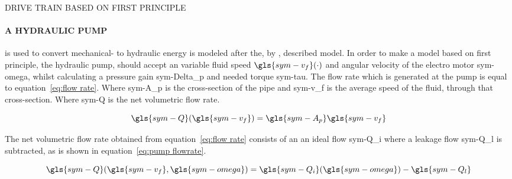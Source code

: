 \begin{RoyalFigure}[!htb, label=fig:propulsionsystemmodel]{DRIVE TRAIN BASED ON FIRST PRINCIPLE}
\end{RoyalFigure}
\newpage

\paragraph{A HYDRAULIC PUMP} is used to convert mechanical- to hydraulic energy is modeled after the, by
\citet{mathworks_mechanical_hydraulic_2016}, described model. In order to make a model based on first principle, the
hydraulic pump, should accept an variable fluid speed \( \gls{sym-v_f}(\cdot) \) and angular velocity of the electro
motor \gls{sym-omega}, whilst calculating a pressure gain \gls{sym-Delta_p} and needed torque \gls{sym-tau}. The flow
rate which is generated at the pump is equal to equation~\ref{eq:flow rate}. Where \gls{sym-A_p} is the cross-section of
the pipe and \gls{sym-v_f} is the average speed of the fluid, through that cross-section. Where \gls{sym-Q} is the net
volumetric flow rate.

\begin{equation}
    \label{eq:flow rate}
    \gls{sym-Q}(\gls{sym-v_f}) = \gls{sym-A_p} \gls{sym-v_f}
\end{equation}

\noindent The net volumetric flow rate obtained from equation~\ref{eq:flow rate} consists of an an ideal flow
\gls{sym-Q_i} where a leakage flow \gls{sym-Q_l} is subtracted, as is shown in equation~\ref{eq:pump flowrate}.

\begin{equation}
    \label{eq:pump flowrate}
    \gls{sym-Q}(\gls{sym-v_f}, \gls{sym-omega}) = \gls{sym-Q_i}(\gls{sym-omega}) - \gls{sym-Q_l}
\end{equation}

